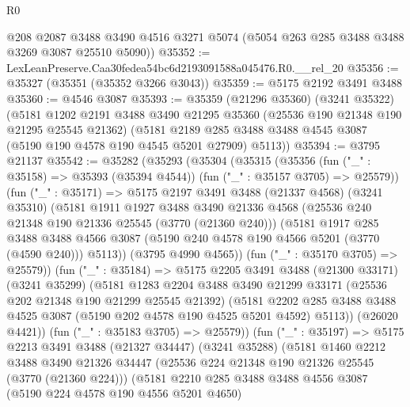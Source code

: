 \begin{lexlean}{R0}
\begin{coremodule}
      @208
      @2087
      @3488
      @3490
      @4516
      @3271
      @5074
      (@5054 @263 @285 @3488 @3488 @3269 @3087 @25510 @5090))
@35352 := LexLeanPreserve.Caa30fedea54bc6d2193091588a045476.R0.__rel_20
@35356 := @35327 (@35351 (@35352 @3266 @3043))
@35359 := @5175 @2192 @3491 @3488
@35360 := @4546 @3087
@35393 := @35359
    (@21296 @35360)
    (@3241 @35322)
    (@5181
      @1202
      @2191
      @3488
      @3490
      @21295
      @35360
      (@25536 @190 @21348 @190 @21295 @25545 @21362)
      (@5181 @2189 @285 @3488 @3488 @4545 @3087 (@5190 @190 @4578 @190 @4545 @5201 @27909) @5113))
@35394 := @3795 @21137
@35542 := @35282
    (@35293
      (@35304
        (@35315
          (@35356
            (fun ("_" : @35158) => @35393 (@35394 @4544))
            (fun ("_" : @35157 @3705) => @25579))
          (fun ("_" : @35171) =>
          @5175
            @2197
            @3491
            @3488
            (@21337 @4568)
            (@3241 @35310)
            (@5181
              @1911
              @1927
              @3488
              @3490
              @21336
              @4568
              (@25536 @240 @21348 @190 @21336 @25545 (@3770 (@21360 @240)))
              (@5181
                @1917
                @285
                @3488
                @3488
                @4566
                @3087
                (@5190 @240 @4578 @190 @4566 @5201 (@3770 (@4590 @240)))
                @5113))
            (@3795 @4990 @4565))
          (fun ("_" : @35170 @3705) => @25579))
        (fun ("_" : @35184) =>
        @5175
          @2205
          @3491
          @3488
          (@21300 @33171)
          (@3241 @35299)
          (@5181
            @1283
            @2204
            @3488
            @3490
            @21299
            @33171
            (@25536 @202 @21348 @190 @21299 @25545 @21392)
            (@5181
              @2202
              @285
              @3488
              @3488
              @4525
              @3087
              (@5190 @202 @4578 @190 @4525 @5201 @4592)
              @5113))
          (@26020 @4421))
        (fun ("_" : @35183 @3705) => @25579))
      (fun ("_" : @35197) =>
      @5175
        @2213
        @3491
        @3488
        (@21327 @34447)
        (@3241 @35288)
        (@5181
          @1460
          @2212
          @3488
          @3490
          @21326
          @34447
          (@25536 @224 @21348 @190 @21326 @25545 (@3770 (@21360 @224)))
          (@5181
            @2210
            @285
            @3488
            @3488
            @4556
            @3087
            (@5190 @224 @4578 @190 @4556 @5201 @4650)

\end{coremodule}
\end{lexlean}
